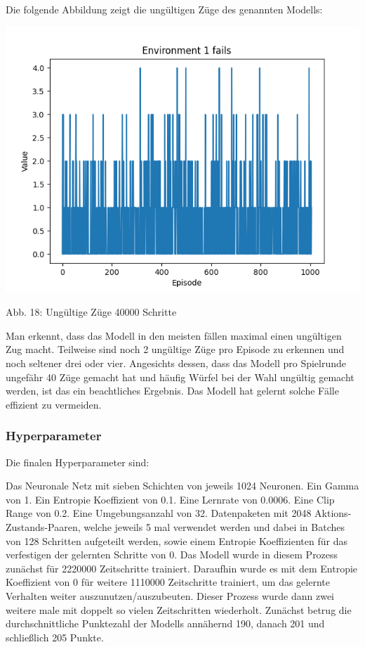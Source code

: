 \begin{minipage}{\linewidth}
	Die folgende Abbildung zeigt die ungültigen Züge des genannten Modells:
	
	\vspace{0.5cm}
	\includegraphics[width=1\textwidth]{Bilder/maskableppo_ganzschoenclever_193avg_v3.1f}
	
	Abb. 18: Ungültige Züge 40000 Schritte\\
	
\end{minipage}

Man erkennt, dass das Modell in den meisten fällen maximal einen ungültigen Zug macht. Teilweise sind noch 2 ungültige Züge pro Episode zu erkennen und noch seltener drei oder vier. Angesichts dessen, dass das Modell pro Spielrunde ungefähr 40 Züge gemacht hat und häufig Würfel bei der Wahl ungültig gemacht werden, ist das ein beachtliches Ergebnis. Das Modell hat gelernt solche Fälle effizient zu vermeiden.
\subsubsection{Hyperparameter}
Die finalen Hyperparameter sind:

Das Neuronale Netz mit sieben Schichten von jeweils 1024 Neuronen. Ein Gamma von 1. Ein Entropie Koeffizient von 0.1. Eine Lernrate von 0.0006. Eine Clip Range von 0.2. Eine Umgebungsanzahl von 32. Datenpaketen mit 2048 Aktions-Zustands-Paaren, welche jeweils 5 mal verwendet werden und dabei in Batches von 128 Schritten aufgeteilt werden, sowie einem Entropie Koeffizienten für das verfestigen der gelernten Schritte von 0. Das Modell wurde in diesem Prozess zunächst für 2220000 Zeitschritte trainiert. Daraufhin wurde es mit dem Entropie Koeffizient von 0 für weitere 1110000 Zeitschritte trainiert, um das gelernte Verhalten weiter auszunutzen/auszubeuten. Dieser Prozess wurde dann zwei weitere male mit doppelt so vielen Zeitschritten wiederholt. Zunächst betrug die durchschnittliche Punktezahl der Modells annähernd 190, danach 201 und schließlich 205 Punkte.

